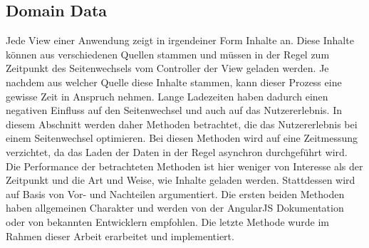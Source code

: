 \subsection{Domain Data}
\label{pt-dd-main}
Jede View einer Anwendung zeigt in irgendeiner Form Inhalte an. Diese Inhalte können aus verschiedenen Quellen stammen und müssen in der Regel zum Zeitpunkt des Seitenwechsels vom Controller der View geladen werden. Je nachdem aus welcher Quelle diese Inhalte stammen, kann dieser Prozess eine gewisse Zeit in Anspruch nehmen. Lange Ladezeiten haben dadurch einen negativen Einfluss auf den Seitenwechsel und auch auf das Nutzererlebnis. In diesem Abschnitt werden daher Methoden betrachtet, die das Nutzererlebnis bei einem Seitenwechsel optimieren. Bei diesen Methoden wird auf eine Zeitmessung verzichtet, da das Laden der Daten in der Regel asynchron durchgeführt wird. Die Performance der betrachteten Methoden ist hier weniger von Interesse als der Zeitpunkt und die Art und Weise, wie Inhalte geladen werden. Stattdessen wird auf Basis von Vor- und Nachteilen argumentiert. Die ersten beiden Methoden haben allgemeinen Charakter und werden von der AngularJS Dokumentation oder von bekannten Entwicklern empfohlen. Die letzte Methode wurde im Rahmen dieser Arbeit erarbeitet und implementiert. 

